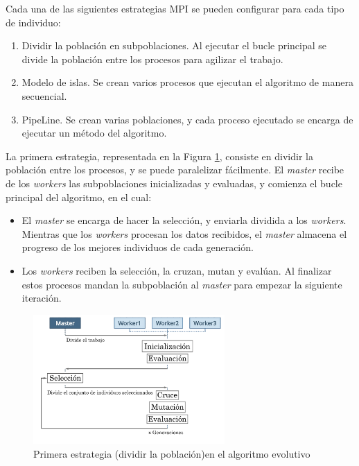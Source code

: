 	
	Cada una de las siguientes estrategias MPI se pueden configurar para cada tipo de individuo:

	\begin{enumerate}
		\item Dividir la población en subpoblaciones. Al ejecutar el bucle principal se divide la población entre los procesos para agilizar el trabajo.
		\item Modelo de islas. Se crean varios procesos que ejecutan el algoritmo de manera secuencial.
		\item PipeLine. Se crean varias poblaciones, y cada proceso ejecutado se encarga de ejecutar un método del algoritmo.
	\end{enumerate}
	
	La primera estrategia, representada en la Figura \ref{fig:pev_mpi1}, consiste en dividir la población entre los procesos, y se puede paralelizar fácilmente. El \textit{master} recibe de los \textit{workers} las subpoblaciones inicializadas y evaluadas, y comienza el bucle principal del algoritmo, en el cual:
	\begin{itemize}
		\item El \textit{master} se encarga de hacer la selección, y enviarla dividida a los \textit{workers}. Mientras que los \textit{workers} procesan los datos recibidos, el \textit{master} almacena el progreso de los mejores individuos de cada generación.
		\item Los \textit{workers} reciben la selección, la cruzan, mutan y evalúan. Al finalizar estos procesos mandan la subpoblación al \textit{master} para empezar la siguiente iteración.
	\end{itemize}
	
	\begin{figure}[!h]
		\centering
		\includegraphics[width=0.65\textwidth]{images/chapter_3/pev_mpi1}
		\caption{Primera estrategia (dividir la población)en el algoritmo evolutivo}
		\label{fig:pev_mpi1}
	\end{figure}
	
